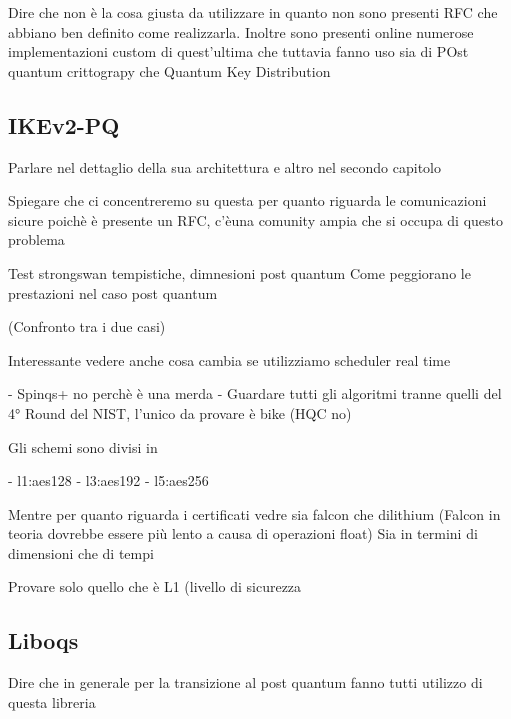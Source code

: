 Dire che non è la cosa giusta da utilizzare in quanto non sono presenti RFC che
abbiano ben definito come realizzarla. Inoltre sono presenti online numerose
implementazioni custom di quest'ultima che tuttavia fanno uso sia di POst
quantum crittograpy che Quantum Key Distribution

\subsection{IKEv2-PQ}

Parlare nel dettaglio della sua architettura e altro nel secondo capitolo

Spiegare che ci concentreremo su questa per quanto riguarda le comunicazioni
sicure poichè è presente un RFC, c'èuna comunity ampia che si occupa di questo
problema


Test strongswan tempistiche, dimnesioni post quantum
Come peggiorano le prestazioni nel caso post quantum 

(Confronto tra i due casi)

Interessante vedere anche cosa cambia se utilizziamo scheduler real time

- Spinqs+ no perchè è una merda
- Guardare tutti gli algoritmi tranne quelli del 4° Round del NIST, l'unico da
provare è bike (HQC no)


Gli schemi sono divisi in 

- l1:aes128
- l3:aes192
- l5:aes256

Mentre per quanto riguarda i certificati vedre sia falcon che dilithium
(Falcon in teoria dovrebbe essere più lento a causa di operazioni float)
Sia in termini di dimensioni che di tempi



Provare solo quello che è L1 (livello di sicurezza 


\subsection{Liboqs}

Dire che in generale per la transizione al post quantum fanno tutti utilizzo di
questa libreria
